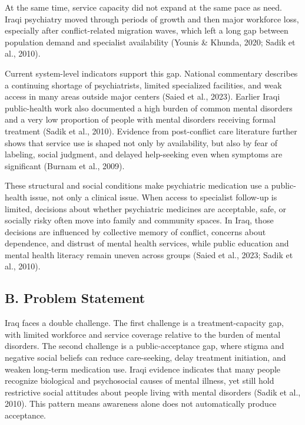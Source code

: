 At the same time, service capacity did not expand at the same pace as
need. Iraqi psychiatry moved through periods of growth and then major
workforce loss, especially after conflict-related migration waves, which
left a long gap between population demand and specialist availability
(Younis \& Khunda, 2020; Sadik et al., 2010).

Current system-level indicators support this gap. National commentary
describes a continuing shortage of psychiatrists, limited specialized
facilities, and weak access in many areas outside major centers (Saied
et al., 2023). Earlier Iraqi public-health work also documented a high
burden of common mental disorders and a very low proportion of people
with mental disorders receiving formal treatment (Sadik et al., 2010).
Evidence from post-conflict care literature further shows that service
use is shaped not only by availability, but also by fear of labeling,
social judgment, and delayed help-seeking even when symptoms are
significant (Burnam et al., 2009).

These structural and social conditions make psychiatric medication use a
public-health issue, not only a clinical issue. When access to
specialist follow-up is limited, decisions about whether psychiatric
medicines are acceptable, safe, or socially risky often move into family
and community spaces. In Iraq, those decisions are influenced by
collective memory of conflict, concerns about dependence, and distrust
of mental health services, while public education and mental health
literacy remain uneven across groups (Saied et al., 2023; Sadik et al.,
2010).

\subsection{B. Problem Statement}\label{b.-problem-statement}

Iraq faces a double challenge. The first challenge is a
treatment-capacity gap, with limited workforce and service coverage
relative to the burden of mental disorders. The second challenge is a
public-acceptance gap, where stigma and negative social beliefs can
reduce care-seeking, delay treatment initiation, and weaken long-term
medication use. Iraqi evidence indicates that many people recognize
biological and psychosocial causes of mental illness, yet still hold
restrictive social attitudes about people living with mental disorders
(Sadik et al., 2010). This pattern means awareness alone does not
automatically produce acceptance.

